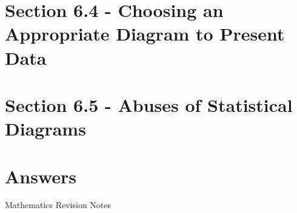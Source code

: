 \documentclass[12pt, a4paper]{article}
\begin{document}
\section*{Section 6.4 - Choosing an Appropriate Diagram to Present Data}\label{section:2-6-4}





\section*{Section 6.5 - Abuses of Statistical Diagrams}\label{section:2-6-5}

\section*{Answers}
\begin{enumx}[label=\arabic*.,start=1]
\item {}
\end{enumx}
\newpage
\newpage
\thispagestyle{empty}
\begin{center}
Mathematics Revision Notes\\\vspace{1cm}
\\\vspace{1cm}
{\fontsize{24pt}{24pt}\selectfont {Linear Equations in Two Unknowns}} \\\vspace{1cm}
\label{chapter:S2-7}

\end{center}
\vspace{0.5cm}
\hline
\end{document}
